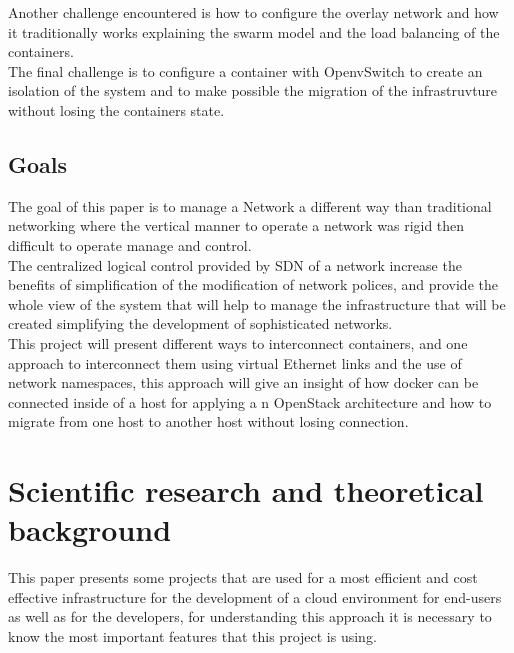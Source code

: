 Another challenge encountered is how to configure the overlay network and how it traditionally works explaining the swarm model and the load balancing of the containers.\\

The final challenge is to configure a container with OpenvSwitch to create an isolation of the system and to make possible the migration of the infrastruvture without losing the containers state.\\
 
\section{Goals}
 
 
The goal of this paper is to manage a Network a different way than traditional networking where the vertical manner to operate a network was rigid then difficult to operate manage and control.\\

The centralized logical control provided by SDN of a network increase the benefits of simplification of the modification of network polices, and provide the whole view of the system that will help to manage the infrastructure that will be created simplifying the development of sophisticated networks.\\
 
This project will present different ways to interconnect containers, and one approach to interconnect them using virtual Ethernet links and the use of network namespaces, this approach will give an insight of how docker can be connected inside of a host for applying a n OpenStack architecture and how to migrate from one host to another host without losing connection.\\
 
  
\chapter{Scientific research and theoretical background} %

\label{Scientific research and theoretical background}
 
 
This paper presents some projects that are used for a most efficient and cost effective infrastructure for the development of a cloud environment for end-users as well as for the developers, for understanding this approach it is necessary to know the most important features that this project is using.\\
 
